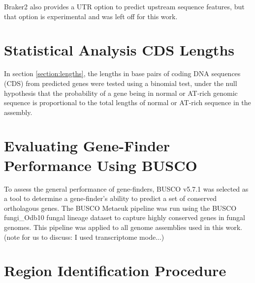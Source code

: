 Braker2 also provides a UTR option to predict upstream sequence
features, but that option is experimental and was left off for this
work.


\section{Statistical Analysis CDS Lengths}

In section \ref{section:lengths}, the lengths in base pairs of coding
DNA sequences (CDS) from predicted genes were tested using a binomial
test, under the null hypothesis that the probability of a gene being
in normal or AT-rich genomic sequence is proportional to the total
lengths of normal or AT-rich sequence in the assembly.

\section{Evaluating Gene-Finder Performance Using BUSCO}

To assess the general performance of gene-finders, BUSCO
v5.7.1\cite{10.1093/bioinformatics/btv351} was selected as a tool to
determine a gene-finder's ability to predict a set of conserved
ortholagous genes. The BUSCO Metaeuk pipeline was run using the BUSCO
fungi\_Odb10 fungal lineage dataset to capture highly conserved genes
in fungal genomes. This pipeline was applied to all genome assemblies
used in this work. (note for us to discuss: I used transcriptome
mode...)

\section{Region Identification Procedure}
\label{section:region-met}

